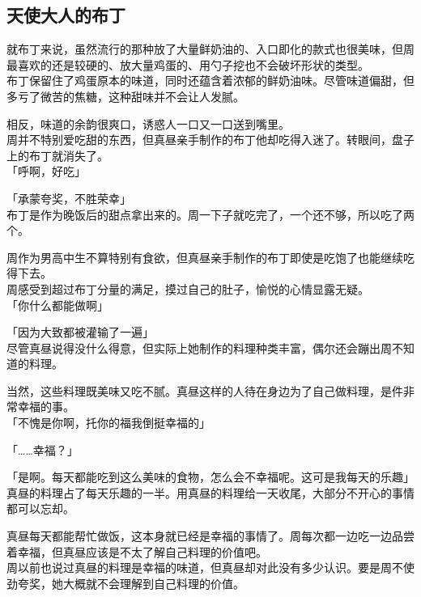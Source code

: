 \subsection{天使大人的布丁}

就布丁来说，虽然流行的那种放了大量鲜奶油的、入口即化的款式也很美味，但周最喜欢的还是较硬的、放大量鸡蛋的、用勺子挖也不会破坏形状的类型。\\

布丁保留住了鸡蛋原本的味道，同时还蕴含着浓郁的鲜奶油味。尽管味道偏甜，但多亏了微苦的焦糖，这种甜味并不会让人发腻。

相反，味道的余韵很爽口，诱惑人一口又一口送到嘴里。\\

周并不特别爱吃甜的东西，但真昼亲手制作的布丁他却吃得入迷了。转眼间，盘子上的布丁就消失了。\\

「呼啊，好吃」

「承蒙夸奖，不胜荣幸」\\

布丁是作为晚饭后的甜点拿出来的。周一下子就吃完了，一个还不够，所以吃了两个。

周作为男高中生不算特别有食欲，但真昼亲手制作的布丁即使是吃饱了也能继续吃得下去。\\

周感受到超过布丁分量的满足，摸过自己的肚子，愉悦的心情显露无疑。\\

「你什么都能做啊」

「因为大致都被灌输了一遍」\\

尽管真昼说得没什么得意，但实际上她制作的料理种类丰富，偶尔还会蹦出周不知道的料理。

当然，这些料理既美味又吃不腻。真昼这样的人待在身边为了自己做料理，是件非常幸福的事。\\

「不愧是你啊，托你的福我倒挺幸福的」

「……幸福？」

「是啊。每天都能吃到这么美味的食物，怎么会不幸福呢。这可是我每天的乐趣」\\

真昼的料理占了每天乐趣的一半。用真昼的料理给一天收尾，大部分不开心的事情都可以忘却。

真昼每天都能帮忙做饭，这本身就已经是幸福的事情了。周每次都一边吃一边品尝着幸福，但真昼应该是不太了解自己料理的价值吧。\\

周以前也说过真昼的料理是幸福的味道，但真昼却对此没有多少认识。要是周不使劲夸奖，她大概就不会理解到自己料理的价值。


